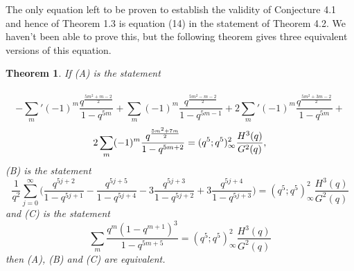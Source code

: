 \documentclass[10pt,reqno]{amsart}
\newtheorem{theorem}{Theorem}[section]
\begin{document}
The only equation left to be proven to establish the validity of Conjecture 4.1 and hence of Theorem 1.3 is equation (14) in the statement of Theorem 4.2. We haven't been able to prove this, but the following theorem gives three equivalent versions of this equation.
\begin{theorem}
If (A) is the statement \\ \\
\begin{equation*}
    -\displaystyle\sum_{m}' (-1)^m\displaystyle\frac{q^{\frac{5m^2+m-2}{2}}}{1-q^{5m}}+\displaystyle\sum_{m}(-1)^m\displaystyle\frac{q^{\frac{5m^2-m-2}{2}}}{1-q^{5m-1}}+2\displaystyle\sum_{m}'(-1)^m\displaystyle\frac{q^{\frac{5m^2+3m-2}{2}}}{1-q^{5m}}+
\end{equation*}
\begin{equation*}
2\displaystyle\sum_{m}(-1)^m\displaystyle\frac{q^{\frac{5m^2+7m}{2}}}{1-q^{5m+2}}=\\ \\
    (q^5;q^5)_{\infty}^2\displaystyle\frac{H^3(q)}{G^2(q)},
\end{equation*}
(B) is the statement 
\begin{equation*}
    \displaystyle\frac{1}{q^2}\displaystyle\sum_{j=0}^{\infty}\Bigg(\displaystyle\frac{q^{5j+2}}{1-q^{5j+1}}-\displaystyle\frac{q^{5j+5}}{1-q^{5j+4}}-3\displaystyle\frac{q^{5j+3}}{1-q^{5j+2}}+3\displaystyle\frac{q^{5j+4}}{1-q^{5j+3}}\Bigg)=(q^5;q^5)_{\infty}^2\displaystyle\frac{H^3(q)}{G^2(q)}
\end{equation*}
and (C) is the statement 
\begin{equation*}
    \displaystyle\sum_{m}\displaystyle\frac{q^m(1-q^{m+1})^3}{1-q^{5m+5}}=(q^5;q^5)_{\infty}^2\displaystyle\frac{H^3(q)}{G^2(q)}
\end{equation*}
then (A), (B) and (C) are equivalent.
\end{theorem}
\end{document}
